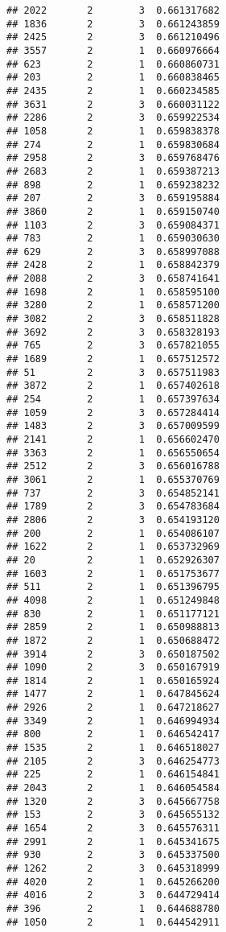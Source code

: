 \documentclass[
]{article}
\begin{document}
\begin{verbatim}
## 2022       2        3  0.661317682
## 1836       2        3  0.661243859
## 2425       2        3  0.661210496
## 3557       2        1  0.660976664
## 623        2        1  0.660860731
## 203        2        1  0.660838465
## 2435       2        1  0.660234585
## 3631       2        3  0.660031122
## 2286       2        3  0.659922534
## 1058       2        1  0.659838378
## 274        2        1  0.659830684
## 2958       2        3  0.659768476
## 2683       2        1  0.659387213
## 898        2        1  0.659238232
## 207        2        3  0.659195884
## 3860       2        1  0.659150740
## 1103       2        3  0.659084371
## 783        2        1  0.659030630
## 629        2        3  0.658997088
## 2428       2        1  0.658842379
## 2088       2        3  0.658741641
## 1698       2        1  0.658595100
## 3280       2        1  0.658571200
## 3082       2        3  0.658511828
## 3692       2        3  0.658328193
## 765        2        3  0.657821055
## 1689       2        1  0.657512572
## 51         2        3  0.657511983
## 3872       2        1  0.657402618
## 254        2        1  0.657397634
## 1059       2        3  0.657284414
## 1483       2        3  0.657009599
## 2141       2        1  0.656602470
## 3363       2        1  0.656550654
## 2512       2        3  0.656016788
## 3061       2        1  0.655370769
## 737        2        3  0.654852141
## 1789       2        3  0.654783684
## 2806       2        3  0.654193120
## 200        2        1  0.654086107
## 1622       2        1  0.653732969
## 20         2        1  0.652926307
## 1603       2        1  0.651753677
## 511        2        1  0.651396795
## 4098       2        1  0.651249848
## 830        2        1  0.651177121
## 2859       2        1  0.650988813
## 1872       2        1  0.650688472
## 3914       2        3  0.650187502
## 1090       2        3  0.650167919
## 1814       2        1  0.650165924
## 1477       2        1  0.647845624
## 2926       2        1  0.647218627
## 3349       2        1  0.646994934
## 800        2        1  0.646542417
## 1535       2        1  0.646518027
## 2105       2        3  0.646254773
## 225        2        1  0.646154841
## 2043       2        1  0.646054584
## 1320       2        3  0.645667758
## 153        2        3  0.645655132
## 1654       2        3  0.645576311
## 2991       2        1  0.645341675
## 930        2        3  0.645337500
## 1262       2        3  0.645318999
## 4020       2        1  0.645266200
## 4016       2        3  0.644729414
## 396        2        1  0.644688780
## 1050       2        1  0.644542911

\end{verbatim}
\end{document}
